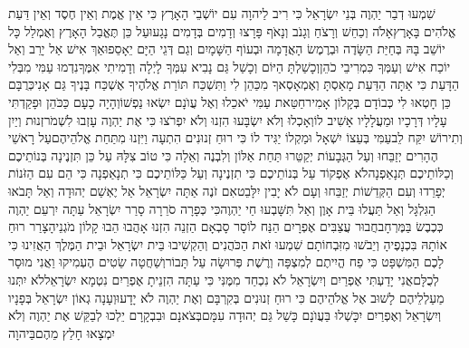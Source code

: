 \documentclass[../main/main.tex]{subfiles}
\begin{document}
\begin{multicols}{\ncols}
שִׁמְעוּ דְבַר יַהְוֶה בְּנֵי יִשְׂרָאֵל כִּי רִיב לַיהוָה עִם יוֹשְׁבֵי הָאָרֶץ כִּי אֵין אֱמֶת וְאֵין חֶסֶד וְאֵין דַּעַת אֱלֹהִים בָּאָרֶץ\PreVerseSpace{}אָלֹה וְכַחֵשׁ וְרָצֹחַ וְגָנֹב וְנָאֹף פָּרָצוּ וְדָמִים בְּדָמִים נָגָעוּ\PreVerseSpace{}עַל כֵּן תֶּאֱבַל הָאָרֶץ וְאֻמְלַל כָּל יוֹשֵׁב בָּהּ בְּחַיַּת הַשָּׂדֶה וּבְרֶמֶשׂ הָאֲדָמָה\OmitEnd{} וּבְעוֹף הַשָּׁמָיִם וְגַם דְּגֵי הַיָּם יֵאָסֵפוּ\PreVerseSpace{}אַךְ אִישׁ אַל יָרֵב וְאַל יוֹכַח אִישׁ וְעַמְּךָ כִּמְרִיבֵי כֹהֵן\PreVerseSpace{}וְכָשַׁלְתָּ הַיּוֹם וְכָשַׁל גַּם נָבִיא עִמְּךָ לָיְלָה וְדָמִיתִי אִמֶּךָ\PreVerseSpace{}נִדְמוּ עַמִּי מִבְּלִי הַדָּעַת כִּי אַתָּה הַדַּעַת מָאַסְתָּ וְאֶמְאָסְאךָ מִכַּהֵן לִי וַתִּשְׁכַּח תּוֹרַת אֱלֹהֶיךָ אֶשְׁכַּח בָּנֶיךָ גַּם אָנִי\PreVerseSpace{}כְּרֻבָּם כֵּן חָטְאוּ לִי כְּבוֹדָם בְּקָלוֹן אָמִיר\PreVerseSpace{}חַטַּאת עַמִּי יֹאכֵלוּ וְאֶל עֲוֺנָם יִשְׂאוּ נַפְשׁוֹ\PreVerseSpace{}וְהָיָה כָעָם כַּכֹּהֵן וּפָקַדְתִּי עָלָיו דְּרָכָיו וּמַעֲלָלָיו אָשִׁיב לוֹ\PreVerseSpace{}וְאָכְלוּ וְלֹא יִשְׂבָּעוּ הִזְנוּ וְלֹא יִפְרֹצוּ כִּי אֶת יַהְוֶה עָזְבוּ לִשְׁמֹר\PreVerseSpace{}זְנוּת וְיַיִן וְתִירוֹשׁ יִקַּח לֵב\PreVerseSpace{}עַמִּי בְּעֵצוֹ יִשְׁאָל וּמַקְלוֹ יַגִּיד לוֹ כִּי רוּחַ זְנוּנִים הִתְעָה וַיִּזְנוּ מִתַּחַת אֱלֹהֵיהֶם\PreVerseSpace{}עַל רָאשֵׁי הֶהָרִים יְזַבֵּחוּ וְעַל הַגְּבָעוֹת יְקַטֵּרוּ תַּחַת אַלּוֹן וְלִבְנֶה וְאֵלָה כִּי טוֹב צִלָּהּ עַל כֵּן תִּזְנֶינָה בְּנוֹתֵיכֶם וְכַלּוֹתֵיכֶם תְּנָאַפְנָה\PreVerseSpace{}לֹא אֶפְקוֹד עַל בְּנוֹתֵיכֶם כִּי תִזְנֶינָה וְעַל כַּלּוֹתֵיכֶם כִּי תְנָאַפְנָה כִּי הֵם עִם הַזֹּנוֹת יְפָרֵדוּ וְעִם הַקְּדֵשׁוֹת יְזַבֵּחוּ וְעָם לֹא יָבִין יִלָּבֵט\PreVerseSpace{}אִם זֹנֶה אַתָּה יִשְׂרָאֵל אַל יֶאְשַׁם יְהוּדָה וְאַל תָּבֹאוּ הַגִּלְגָּל וְאַל תַּעֲלוּ בֵּית אָוֶן וְאַל תִּשָּׁבְעוּ חַי יַהְוֶה\PreVerseSpace{}כִּי כְּפָרָה סֹרֵרָה סָרַר יִשְׂרָאֵל עַתָּה יִרְעֵם יַהְוֶה כְּכֶבֶשׂ בַּמֶּרְחָב\PreVerseSpace{}חֲבוּר עֲצַבִּים אֶפְרָיִם הַנַּח לוֹ\PreVerseSpace{}סָר סָבְאָם הַזְנֵה הִזְנוּ אָהֲבוּ הֵבוּ קָלוֹן מֹגְנֵיהָ\SubEnd{}\PreVerseSpace{}צָרַר רוּחַ אוֹתָהּ בִּכְנָפֶיהָ וְיֵבֹשׁוּ מִזִּבְחוֹתָם \ClosedSection{}שִׁמְעוּ זֹאת הַכֹּהֲנִים וְהַקְשִׁיבוּ בֵּית יִשְׂרָאֵל וּבֵית הַמֶּלֶךְ הַאֲזִינוּ כִּי לָכֶם הַמִּשְׁפָּט כִּי פַח הֱיִיתֶם לְמִצְפָּה וְרֶשֶׁת פְּרוּשָׂה עַל תָּבוֹר\PreVerseSpace{}וְשַׁחֲטָה שֵׂטִים הֶעְמִיקוּ וַאֲנִי מוּסָר לְכֻלָּם\PreVerseSpace{}אֲנִי יָדַעְתִּי אֶפְרַיִם וְיִשְׂרָאֵל לֹא נִכְחַד מִמֶּנִּי כִּי עַתָּה הִזְנֵיתָ אֶפְרַיִם נִטְמָא יִשְׂרָאֵל\PreVerseSpace{}לֹא יִתְּנוּ מַעַלְלֵיהֶם לָשׁוּב אֶל אֱלֹהֵיהֶם כִּי רוּחַ זְנוּנִים בְּקִרְבָּם וְאֶת יַהְוֶה לֹא יָדָעוּ\PreVerseSpace{}וְעָנָה גְאוֹן יִשְׂרָאֵל בְּפָנָיו וְיִשְׂרָאֵל וְאֶפְרַיִם יִכָּשְׁלוּ בַּעֲוֺנָם כָּשַׁל גַּם יְהוּדָה עִמָּם\PreVerseSpace{}בְּצֹאנָם וּבִבְקָרָם יֵלְכוּ לְבַקֵּשׁ אֶת יַהְוֶה וְלֹא יִמְצָאוּ חָלַץ מֵהֶם\PreVerseSpace{}בַּיהוָה 
\end{multicols}
\end{document}
